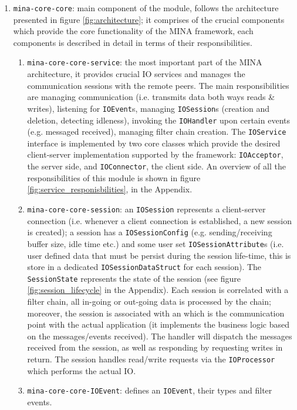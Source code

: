 \begin{enumerate}
    \item \texttt{mina-core-core}: main component of the module, follows the architecture presented in figure \ref{fig:architecture}; it comprises of the crucial components which provide the core functionality of the MINA framework, each components is described in detail in terms of their responsibilities.
        \begin{enumerate}
            \item \texttt{mina-core-core-service}: the most important part of the MINA architecture, it provides crucial IO services and manages the communication sessions with the remote peers. The main responsibilities are managing communication  (i.e. transmits data both ways reads \& writes), listening for \texttt{IOEvent}s, managing \texttt{IOSession}s (creation and deletion, detecting idleness), invoking the \texttt{IOHandler} upon certain events (e.g. messaged received), managing filter chain creation. The \texttt{IOService} interface is implemented by two core classes which provide the desired client-server implementation supported by the framework: \texttt{IOAcceptor}, the server side, and \texttt{IOConnector}, the client side. An overview of all the responsibilities of this module is shown in figure \ref{fig:service_responisbilities}, in the Appendix.
            \item \texttt{mina-core-core-session}: an \texttt{IOSession} represents a client-server connection (i.e. whenever a client connection is established, a new session is created); a session has a \texttt{IOSessionConfig} (e.g. sending/receiving buffer size, idle time etc.) and some user set \texttt{IOSessionAttribute}s (i.e. user defined data that must be persist during the session life-time, this is store in a dedicated \texttt{IOSessionDataStruct} for each session). The \texttt{SessionState} represents the state of the session (see figure \ref{fig:session_lifecycle} in the Appendix). Each session is correlated with a filter chain, all in-going or out-going data is processed  by the chain; moreover, the session is associated with an  which is the communication point with the actual application (it implements the business logic based on the messages/events received). The handler will dispatch the messages received from the session, as well as responding by requesting writes in return. The session handles read/write requests via the \texttt{IOProcessor} which performs the actual IO.
            \item \texttt{mina-core-core-IOEvent}: defines an \texttt{IOEvent}, their types and filter events.

\end{enumerate}
\end{enumerate}
